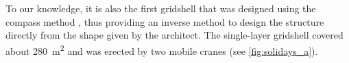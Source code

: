 To our knowledge, it is also the first gridshell that was designed using the compass method \cite{IL10}, thus providing an inverse method to design the structure directly from the shape given by the architect. The single-layer gridshell covered about \SI{280}{m^2} and was erected by two mobile cranes (see \cref{fig:solidays_a}).





